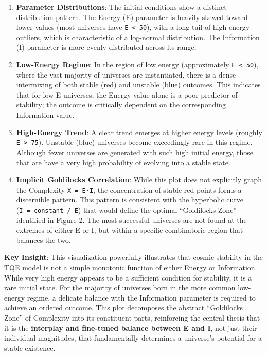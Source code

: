 \begin{enumerate}
\def\labelenumi{\arabic{enumi}.}
\item
  \textbf{Parameter Distributions}: The initial conditions show a
  distinct distribution pattern. The Energy (E) parameter is heavily
  skewed toward lower values (most universes have
  \texttt{E\ \textless{}\ 50}), with a long tail of high-energy
  outliers, which is characteristic of a log-normal distribution. The
  Information (I) parameter is more evenly distributed across its range.
\item
  \textbf{Low-Energy Regime}: In the region of low energy (approximately
  \texttt{E\ \textless{}\ 50}), where the vast majority of universes are
  instantiated, there is a dense intermixing of both stable (red) and
  unstable (blue) outcomes. This indicates that for low-E universes, the
  Energy value alone is a poor predictor of stability; the outcome is
  critically dependent on the corresponding Information value.
\item
  \textbf{High-Energy Trend}: A clear trend emerges at higher energy
  levels (roughly \texttt{E\ \textgreater{}\ 75}). Unstable (blue)
  universes become exceedingly rare in this regime. Although fewer
  universes are generated with such high initial energy, those that are
  have a very high probability of evolving into a stable state.
\item
  \textbf{Implicit Goldilocks Correlation}: While this plot does not
  explicitly graph the Complexity \texttt{X\ =\ E·I}, the concentration
  of stable red points forms a discernible pattern. This pattern is
  consistent with the hyperbolic curve (\texttt{I\ =\ constant\ /\ E})
  that would define the optimal ``Goldilocks Zone'' identified in Figure
  2. The most successful universes are not found at the extremes of
  either E or I, but within a specific combinatoric region that balances
  the two.
\end{enumerate}

\textbf{Key Insight}: This visualization powerfully illustrates that
cosmic stability in the TQE model is not a simple monotonic function of
either Energy or Information. While very high energy appears to be a
sufficient condition for stability, it is a rare initial state. For the
majority of universes born in the more common low-energy regime, a
delicate balance with the Information parameter is required to achieve
an ordered outcome. This plot decomposes the abstract ``Goldilocks
Zone'' of Complexity into its constituent parts, reinforcing the central
thesis that it is the \textbf{interplay and fine-tuned balance between E
and I}, not just their individual magnitudes, that fundamentally
determines a universe's potential for a stable existence.

